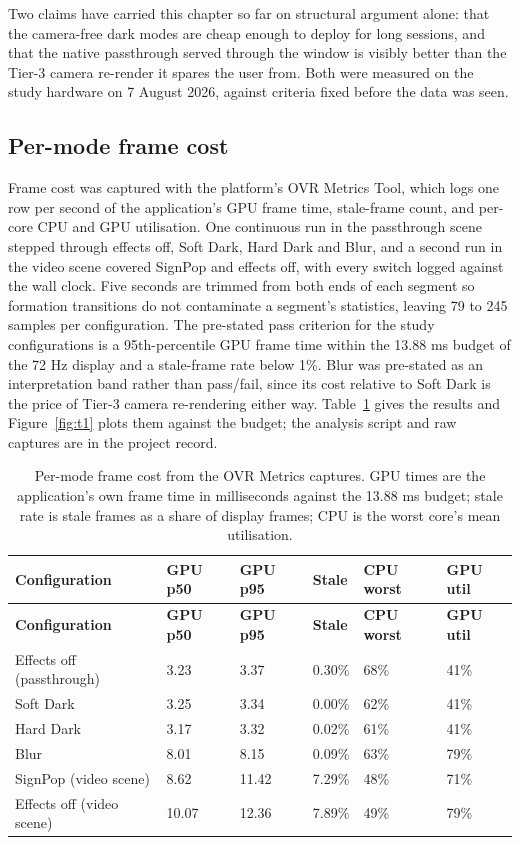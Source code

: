 Two claims have carried this chapter so far on structural argument alone: that the camera-free dark
modes are cheap enough to deploy for long sessions, and that the native passthrough served through
the window is visibly better than the Tier-3 camera re-render it spares the user from. Both were
measured on the study hardware on 7 August 2026, against criteria fixed before the data was seen.

\subsection{Per-mode frame cost}

Frame cost was captured with the platform's OVR Metrics Tool, which logs one row per second of the
application's GPU frame time, stale-frame count, and per-core CPU and GPU utilisation. One
continuous run in the passthrough scene stepped through effects off, Soft Dark, Hard Dark and Blur,
and a second run in the video scene covered SignPop and effects off, with every switch logged
against the wall clock. Five seconds are trimmed from both ends of each segment so formation
transitions do not contaminate a segment's statistics, leaving 79 to 245 samples per configuration.
The pre-stated pass criterion for the study configurations is a 95th-percentile GPU frame time
within the 13.88 ms budget of the 72 Hz display and a stale-frame rate below 1\%. Blur was
pre-stated as an interpretation band rather than pass/fail, since its cost relative to Soft Dark is
the price of Tier-3 camera re-rendering either way. Table~\ref{tab:t1} gives the results and
Figure~\ref{fig:t1} plots them against the budget; the analysis script and raw captures are in the
project record.

\begin{longtable}{p{}|p{}|p{}|p{}|p{}|p{}}
\caption{Per-mode frame cost from the OVR Metrics captures. GPU times are the application's own
frame time in milliseconds against the 13.88 ms budget; stale rate is stale frames as a share of
display frames; CPU is the worst core's mean utilisation.}
\label{tab:t1} \\
\hline
\textbf{Configuration} & \textbf{GPU p50} & \textbf{GPU p95} & \textbf{Stale} & \textbf{CPU worst} & \textbf{GPU util} \\
\hline
\endfirsthead
\hline
\textbf{Configuration} & \textbf{GPU p50} & \textbf{GPU p95} & \textbf{Stale} & \textbf{CPU worst} & \textbf{GPU util} \\
\hline
\endhead
\hline
Effects off (passthrough) & 3.23 & 3.37 & 0.30\% & 68\% & 41\% \\
Soft Dark & 3.25 & 3.34 & 0.00\% & 62\% & 41\% \\
Hard Dark & 3.17 & 3.32 & 0.02\% & 61\% & 41\% \\
Blur & 8.01 & 8.15 & 0.09\% & 63\% & 79\% \\
SignPop (video scene) & 8.62 & 11.42 & 7.29\% & 48\% & 71\% \\
Effects off (video scene) & 10.07 & 12.36 & 7.89\% & 49\% & 79\% \\
\hline
\end{longtable}

